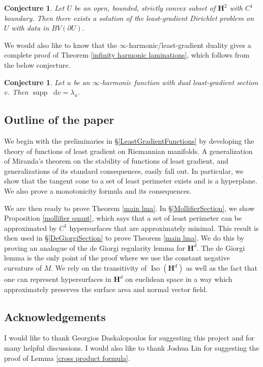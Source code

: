\documentclass[reqno,12pt,letterpaper]{amsart}
\newcommand{\Hyp}{\mathbf H}
\DeclareMathOperator{\Iso}{Iso}
\DeclareMathOperator{\supp}{supp}
\newcommand*\dif{\mathop{}\!\mathrm{d}}
\newtheorem{conjecture}[theorem]{Conjecture}
\theoremstyle{definition}
\numberwithin{equation}{section}
\begin{document}
\begin{conjecture}
Let $U$ be an open, bounded, strictly convex subset of $\Hyp^2$ with $C^1$ boundary.
Then there exists a solution of the least-gradient Dirichlet problem on $U$ with data in $BV(\partial U)$.
\end{conjecture}

We would also like to know that the $\infty$-harmonic/least-gradient duality gives a complete proof of Theorem \ref{infinity harmonic laminations}, which follows from the below conjecture.

\begin{conjecture}\label{two laminations agree}
Let $u$ be an $\infty$-harmonic function with dual least-gradient section $v$.
Then $\supp \dif v = \lambda_u$.
\end{conjecture}


\subsection{Outline of the paper}
We begin with the preliminaries in \S\ref{LeastGradientFunctions} by developing the theory of functions of least gradient on Riemannian manifolds. A generalization of Miranda's theorem \cite[Teorema 3]{Miranda67} on the stability of functions of least gradient, and generalizations of its standard consequences, easily fall out.
In particular, we show that the tangent cone to a set of least perimeter exists and is a hyperplane.
We also prove a monotonicity formula and its consequences.

We are then ready to prove Theorem \ref{main lma}.
In \S\ref{MollifierSection}, we show Proposition \ref{mollifier quant}, which says that a set of least perimeter can be approximated by $C^1$ hypersurfaces that are approximately minimal.
This result is then used in \S\ref{DeGiorgiSection} to prove Theorem \ref{main lma}. We do this by proving an analogue of the de Giorgi regularity lemma \cite[Teorema 5.7]{Miranda66} for $\Hyp^d$. The de Giorgi lemma is the only point of the proof where we use the constant negative curvature of $M$.
We rely on the transitivity of $\Iso(\Hyp^d)$ as well as the fact that one can represent hypersurfaces in $\Hyp^d$ on euclidean space in a way which approximately preserves the surface area and normal vector field.


\subsection{Acknowledgements}
I would like to thank Georgios Daskalopoulos for suggesting this project and for many helpful discussions.
I would also like to thank Joshua Lin for suggesting the proof of Lemma \ref{cross product formula}.
\end{document}
